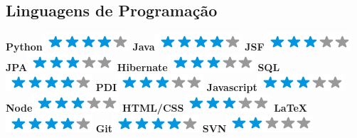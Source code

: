 \documentclass[]{friggeri-cv}
\begin{document}
\begin{aside}
    \section{Linguagens de Programação}
    \singlespacing
    \textbf{Python}\includegraphics[scale=0.40]{img/4stars.png}
    \textbf{Java}\includegraphics[scale=0.40]{img/4stars.png}
    \textbf{JSF}\includegraphics[scale=0.40]{img/3stars.png}
    \textbf{JPA}\includegraphics[scale=0.40]{img/3stars.png}
    \textbf{Hibernate}\includegraphics[scale=0.40]{img/3stars.png}
    \textbf{SQL}\includegraphics[scale=0.40]{img/4stars.png}
    \textbf{PDI}\includegraphics[scale=0.40]{img/3stars.png}
    \textbf{Javascript}\includegraphics[scale=0.40]{img/3stars.png}
    \textbf{Node}\includegraphics[scale=0.40]{img/3stars.png}
    \textbf{HTML/CSS}\includegraphics[scale=0.40]{img/3stars.png}
    \textbf{LaTeX}\includegraphics[scale=0.40]{img/4stars.png}
    \textbf{Git}\includegraphics[scale=0.40]{img/4stars.png}
    \textbf{SVN}\includegraphics[scale=0.40]{img/2stars.png}
    ~

\end{aside}
\end{document}
